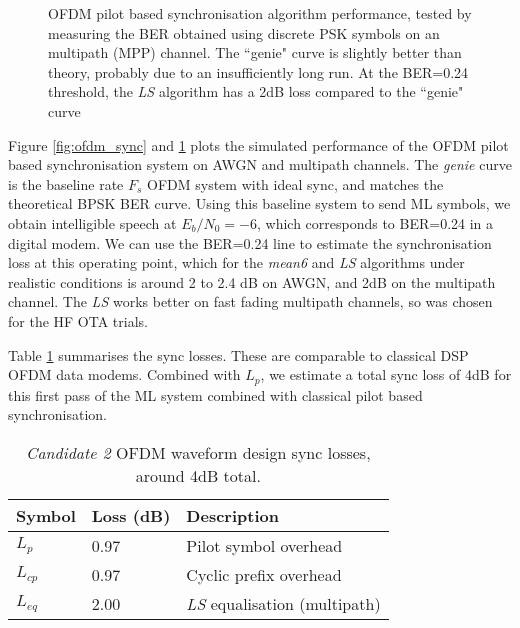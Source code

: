 \documentclass{article}
\begin{document}
\begin{figure}[h]
\caption{OFDM pilot based synchronisation algorithm performance, tested by measuring the BER obtained using discrete PSK symbols on an multipath (MPP) channel. The ``genie" curve is slightly better than theory, probably due to an insufficiently long run.  At the BER=0.24 threshold, the \emph{LS} algorithm has a 2dB loss compared to the ``genie" curve}
\label{fig:ofdm_sync_mp}
\begin{center}

\end{center}
\end{figure}

Figure \ref{fig:ofdm_sync} and \ref{fig:ofdm_sync_mp} plots the simulated performance of the OFDM pilot based synchronisation system on AWGN and multipath channels.  The \emph{genie} curve is the baseline rate $F_s$ OFDM system with ideal sync, and matches the theoretical BPSK BER curve.  Using this baseline system to send ML symbols, we obtain intelligible speech at $E_b/N_0=-6$, which corresponds to BER=0.24 in a digital modem.  We can use the BER=0.24 line to estimate the synchronisation loss at this operating point, which for the \emph{mean6} and \emph{LS} algorithms under realistic conditions is around 2 to 2.4 dB on AWGN, and 2dB on the  multipath channel. The \emph{LS} works better on fast fading multipath channels, so was chosen for the HF OTA trials.

Table \ref{tab:sync_losses} summarises the sync losses.  These are comparable to classical DSP OFDM data modems. Combined with $L_p$, we estimate a total sync loss of 4dB for this first pass of the ML system combined with classical pilot based synchronisation.

\begin{table} [H]
\centering
\begin{tabular}{ l | l | l}
 \hline
 Symbol & Loss (dB) & Description \\
 \hline
 $L_p$  & 0.97  & Pilot symbol overhead \\
 $L_{cp}$  & 0.97  & Cyclic prefix overhead \\
 $L_{eq}$  & 2.00  & \emph{LS} equalisation (multipath) \\
  \hline
\end{tabular}
\caption{\emph{Candidate 2} OFDM waveform design sync losses, around 4dB total.}
\label{tab:sync_losses}
\end{table}
\end{document}
